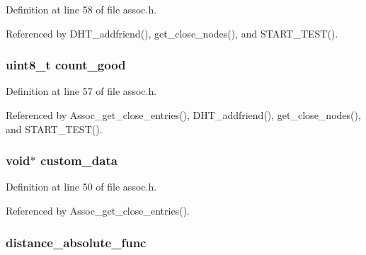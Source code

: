 Definition at line 58 of file assoc.\+h.



Referenced by D\+H\+T\+\_\+addfriend(), get\+\_\+close\+\_\+nodes(), and S\+T\+A\+R\+T\+\_\+\+T\+E\+S\+T().

\hypertarget{struct_assoc__close__entries_a086e0ce002c9491e4b99956740bb53d4}{
\subsubsection[{count\+\_\+good}]{\setlength{\rightskip}{0pt plus 5cm}uint8\+\_\+t count\+\_\+good}}\label{struct_assoc__close__entries_a086e0ce002c9491e4b99956740bb53d4}


Definition at line 57 of file assoc.\+h.



Referenced by Assoc\+\_\+get\+\_\+close\+\_\+entries(), D\+H\+T\+\_\+addfriend(), get\+\_\+close\+\_\+nodes(), and S\+T\+A\+R\+T\+\_\+\+T\+E\+S\+T().

\hypertarget{struct_assoc__close__entries_a89491b1d291e113f86c1d33a3c1ec66b}{
\subsubsection[{custom\+\_\+data}]{\setlength{\rightskip}{0pt plus 5cm}void$\ast$ custom\+\_\+data}}\label{struct_assoc__close__entries_a89491b1d291e113f86c1d33a3c1ec66b}


Definition at line 50 of file assoc.\+h.



Referenced by Assoc\+\_\+get\+\_\+close\+\_\+entries().

\hypertarget{struct_assoc__close__entries_aedd1522117fb10fb74c7054f25f2d282}{
\subsubsection[{distance\+\_\+absolute\+\_\+func}]{ distance\+\_\+absolute\+\_\+func}}\label{struct_assoc__close__entries_aedd1522117fb10fb74c7054f25f2d282}


